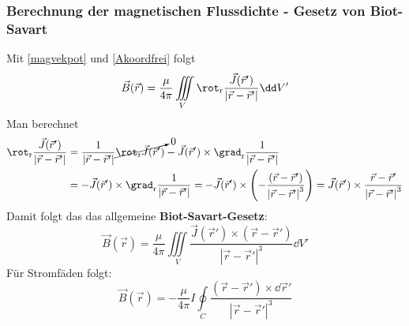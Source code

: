   \subsubsection{Berechnung der magnetischen Flussdichte - Gesetz von Biot-Savart}
		   Mit \ref{magvekpot} und \ref{Akoordfrei} folgt
		        $$
			        \vec{B} (\vec{r} ) = \dfrac{\mu}{4 \pi} \iiint\limits_{V} \rot _\mathrm{r} \dfrac{\vec{J}(\vec{r}' )}{\left| \vec{r}  - \vec{r}'  \right|} \dd V'
		        $$
		   Man berechnet
		        \begin{equation}\begin{split}
				        \rot _\mathrm{r} \dfrac{\vec{J}(\vec{r}' )}{\left| \vec{r}  - \vec{r}'  \right|} &= \dfrac{1}{\left| \vec{r}  - \vec{r}'  \right|}  \cancelto{0}{\rot _\mathrm{r} \vec{J}(\vec{r}' )} - \vec{J}(\vec{r}' ) \times \grad _\mathrm{r} \dfrac{1}{\left| \vec{r}  - \vec{r}'  \right|} \\
				        &= -\vec{J}(\vec{r}' ) \times \grad _\mathrm{r} \dfrac{1}{\left| \vec{r}  - \vec{r}'  \right|} = -\vec{J}(\vec{r}' ) \times \left( -\dfrac{\left( \vec{r}  - \vec{r}'  \right)}{\left| \vec{r}  - \vec{r}'  \right|^3} \right) = \vec{J}(\vec{r}' ) \times \dfrac{\vec{r}  - \vec{r}' }{\left| \vec{r}  - \vec{r}'  \right|^3}
			        \end{split}\end{equation}
		   Damit folgt das das allgemeine \textbf{Biot-Savart-Gesetz}:
		        \begin{equation}\label{biot-savart}
			        \boxed{\vec{B} (\vec{r} ) = \dfrac{\mu}{4  \pi} \iiint\limits_{V} \dfrac{\vec{J}(\vec{r}' ) \times \left( \vec{r}  - \vec{r}'  \right)}{\left| \vec{r}  - \vec{r}'  \right|^3} \dd V'}
		        \end{equation}
		  Für Stromfäden folgt:
		        \begin{equation}
			        \boxed{\vec{B} (\vec{r} ) = -\dfrac{\mu}{4  \pi}   I  \oint\limits_{C} \dfrac{\left( \vec{r}  - \vec{r}'  \right) \times \dd \vec{r}'}{\left| \vec{r}  - \vec{r}'  \right|^3}} 
		        \end{equation}	
